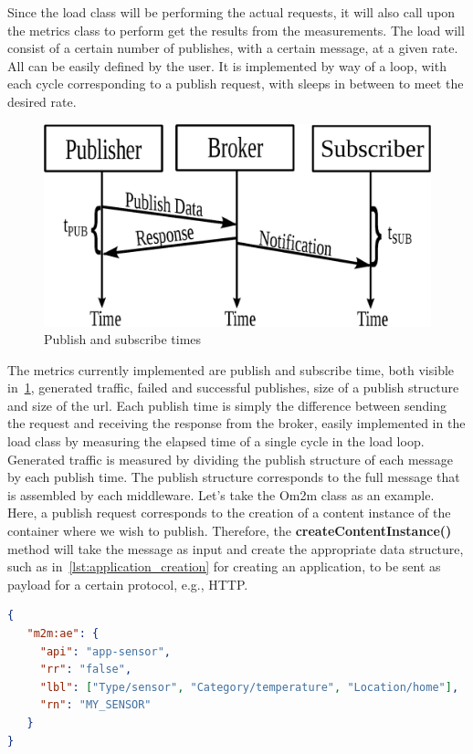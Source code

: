 \documentclass[conference]{IEEEtran}
\begin{document}
Since the load class will be performing the actual requests, it will also call upon the metrics class to perform get the results from the measurements. The load will consist of a certain number of publishes, with a certain message, at a given rate. All can be easily defined by the user. It is implemented by way of a loop, with each cycle corresponding to a publish request, with sleeps in between to meet the desired rate.

\begin{figure}[htbp!]
  \centering
  \includegraphics[width=\linewidth]{figures/pub_sub_time.eps}
  \caption{Publish and subscribe times~\cite{cardoso_benchmarking_2017}}
  \label{fig:pub_sub_time}
\end{figure}

The metrics currently implemented are publish and subscribe time, both visible in~\ref{fig:pub_sub_time}, generated traffic, failed and successful publishes, size of a publish structure and size of the url. Each publish time is simply the difference between sending the request and receiving the response from the broker, easily implemented in the load class by measuring the elapsed time of a single cycle in the load loop.
Generated traffic is measured by dividing the publish structure of each message by each publish time. The publish structure corresponds to the full message that is assembled by each middleware. Let's take the Om2m class as an example. Here, a publish request corresponds to the creation of a content instance of the container where we wish to publish. Therefore, the \textbf{createContentInstance()} method will take the message as input and create the appropriate data structure, such as in~\ref{lst:application_creation} for creating an application, to be sent as payload for a certain protocol, e.g., HTTP\@.

\begin{lstlisting}[linewidth=\columnwidth, caption=JSON payload for application creation, captionpos=b, label=lst:application_creation, language=json]
{
   "m2m:ae": {
     "api": "app-sensor",
     "rr": "false",
     "lbl": ["Type/sensor", "Category/temperature", "Location/home"],
     "rn": "MY_SENSOR"
   }
}
\end{lstlisting}
\end{document}
